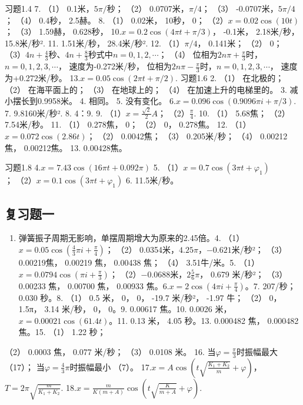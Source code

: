 习题1.4 7. （1） 0.1米，\(5\pi/\text{秒}\)； （2） 0.0707米，\(\pi/4\)；
（3） -0.0707米，\(5\pi/4\)； （4） 0.4秒， 2.5赫。 8. （1） 0.02米，
10秒， 0； （2）\(x=0.02\cos(10t)\)； （3） 1.59赫， 0.628秒，
10.\(x=0.2\cos(4\pi t+\pi/3)\)， -0.1米， 2.18米/秒， 15.8米/秒². 11.
1.51米/秒， 28.4米/秒². 12. （1）\(\pi/4\)， 0.141米； （2） 0；
（3）\(4n+\frac{4}{3}\)秒、\(4n+\frac{8}{3}\)秒式中\(n=0,1,2,\cdots\)；
（4） 位相为\(2n\pi+\frac{\pi}{3}\)时，\(n=0,1,2,3,\cdots\)，
速度为-0.272米/秒，
位相为\(2n\pi-\frac{\pi}{3}\)时，\(n=0,1,2,3,\cdots\)，
速度为+0.272米/秒。 13.\(x=0.05\cos(2\pi t+\pi/2)\). 习题1.6 2. （1）
在北极的； （2） 在海平面上的； （3） 在地球上的； （4）
在加速上升的电梯里的。 3. 减小摆长到0.9958米。 4. 相同。 5. 没有变化。
6.\(x=0.096\cos(0.9096\pi i+\pi/3)\). 7. 9.8160米/秒². 8. 4：9. 9.
（1）\(x=\frac{\sqrt{2}}{2}A\)； （2）\(\frac{\pi}{4}\). 10. （1）
5.68焦； （2） 7.54米/秒。 11. （1） 0.278焦， 0； （2） 0， 0.278焦。
12. （1）\(x=0.072\cos(2.86t)\)； （2） 0.0042焦； （3） 0.205米/秒；
（4） 0.00212焦， 0.00212焦。 13. 0.00428焦。

习题1.8 4.\(x = 7.43\cos (16\pi t + 0.092\pi)\) 5.
（1）\(x = 0.7\cos (3\pi t + \varphi_1)\)；
（2）\(x = 0.1\cos (3\pi t + \varphi_1)\) 6. 11.5米/秒。

\subsection{复习题一}\label{ux590dux4e60ux9898ux4e00-1}

\begin{enumerate}
\def\labelenumi{\arabic{enumi}.}
\tightlist
\item
  弹簧振子周期无影响，单摆周期增大为原来的2.45倍。4.
  （1）\(x = 0.05\cos \left(\frac{4}{3}\pi i + \frac{\pi}{4}\right)\)；
  （2） 0.0354米，\(4.25\pi\)，\(-0.621\)米/秒²； （3） 0.00219焦，
  0.00219 焦， 0.00438 焦； （4） 3.51牛/米。5.
  （1）\(x = 0.0794\cos \left(\pi i + \frac{\pi}{3}\right)\)；
  （2）\(-0.0688\)米，\(2\frac{5}{6}\pi\)， 0.679 米/秒²； （3） 0.00233
  焦， 0.00700 焦， 0.00933
  焦。6.\(x = 2\cos \left(4\pi i + \frac{\pi}{4}\right)\)。7. 207/秒；
  0.030 秒。8. （1） 0.5 米， 0， 0， -19.7 米/秒²， -1.97 牛； （2）
  0， 1.5π， 3.14 米/秒， 0， 0。9. 0.00617 焦。10. 0.0026
  米，\(x = 0.00021\cos (61.4t)\)。11. 0.13 米， 4.05 秒。13. 0.000482
  焦， 0.000482 焦。15. （1） 1.22 秒；
\end{enumerate}

（2） 0.0003 焦， 0.077 米/秒； （3） 0.0108 米。 16.
当\(\varphi = \frac{\pi}{3}\)时振幅最大 （17）；
当\(\varphi = \frac{4}{3}\pi\)时振幅最小 （7）。
17.\(x = A\cos \left(t\sqrt{\frac{K_1 + K_2}{m}} + \varphi\right)\)，\(T = 2\pi\sqrt{\frac{m}{K_1 + K_2}}\).
18.\(x = \frac{m}{K(m + A)}\cos \left(t\sqrt{\frac{K}{m + A}} + \varphi\right)\).

